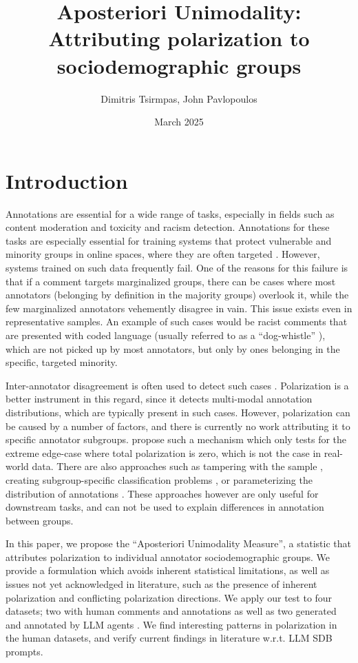 \documentclass{article}
\title{Aposteriori Unimodality: Attributing polarization to sociodemographic groups}
\author{Dimitris Tsirmpas, John Pavlopoulos}
\date{March 2025}
\begin{document}
\maketitle


\section{Introduction}

Annotations are essential for a wide range of tasks, especially in fields such as content moderation and toxicity and racism detection. Annotations for these tasks are especially essential for training systems that protect vulnerable and minority groups in online spaces, where they are often targeted \parencite{un_hate_speech_targets, ucdavis_hate_speech}. However, systems trained on such data frequently fail. One of the reasons for this failure is that if a comment targets marginalized groups, there can be cases where most annotators (belonging by definition in the majority groups) overlook it, while the few marginalized annotators vehemently disagree in vain. This issue exists even in representative samples. An example of such cases would be racist comments that are presented with coded language (usually referred to as a ``dog-whistle'' \parencite{quaranto2022dog}), which are not picked up by most annotators, but only by ones belonging in the specific, targeted minority. %

Inter-annotator disagreement is often used to detect such cases \parencite{petra_2022_handling}. Polarization \parencite{Pavlopoulos2023, pavlopoulos-likas-2024} is a better instrument in this regard, since it detects multi-modal annotation distributions, which are typically present in such cases. However, polarization can be caused by a number of factors, and there is currently no work attributing it to specific annotator subgroups.  \textcite{pavlopoulos-likas-2024} propose such a mechanism which only tests for the extreme edge-case where total polarization is zero, which is not the case in real-world data. %
There are also approaches such as tampering with the sample \parencite{eckman_2025_aligning}, creating subgroup-specific classification problems \cite{akhtar_2020_modeling}, or parameterizing the distribution of annotations \parencite{casola-etal-2023-confidence}. These approaches however are only useful for downstream tasks, and can not be used to explain differences in annotation between groups.

In this paper, we propose the ``Aposteriori Unimodality Measure'', a statistic that attributes polarization to individual annotator sociodemographic groups. We provide a formulation which avoids inherent statistical limitations, as well as issues not yet acknowledged in literature, such as the presence of inherent polarization and conflicting polarization directions. We apply our test to four datasets; two with human comments and annotations \parencite{sap-etal-2022-annotators, kumar-et-al-2021} as well as two generated and annotated by \ac{LLM} agents \cite{tsirmpas2025scalableevaluationonlinefacilitation}. We find interesting patterns in polarization in the human datasets, and verify current findings in literature w.r.t. \ac{LLM} \ac{SDB} prompts.
\end{document}
